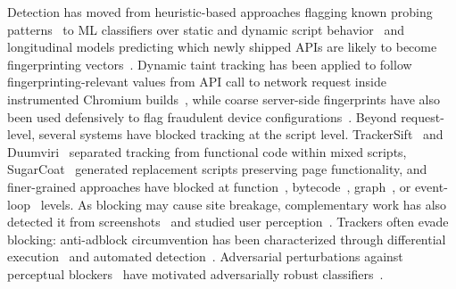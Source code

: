%
Detection has moved from heuristic-based approaches flagging known probing patterns~\cite{acarFPDetectiveDustingWeb2013} to ML classifiers over static and dynamic script behavior~\cite{iqbalFingerprintingFingerprintersLearning2021} and longitudinal models predicting which newly shipped APIs are likely to become fingerprinting vectors~\cite{bahramiFPRadarLongitudinalMeasurement2022}.
%
Dynamic taint tracking has been applied to follow fingerprinting-relevant values from API call to network request inside instrumented Chromium builds~\cite{boussahaFPtracerFinegrainedBrowser2024,kanyalPanoptiChromeModernInbrowser2024,hubletUserControlledPrivacyTaint2024}, while coarse server-side fingerprints have also been used defensively to flag fraudulent device configurations~\cite{kalantariBrowserPolygraphEfficient2024}.
% 
Beyond request-level, several systems have blocked tracking at the script level.
%
TrackerSift~\cite{amjadTrackerSiftUntanglingMixed2021} and Duumviri~\cite{shuangDuumviriDetectingTrackers2025} separated tracking from functional code within mixed scripts, SugarCoat~\cite{smithSugarCoatProgrammaticallyGenerating2021} generated replacement scripts preserving page functionality, and finer-grained approaches have blocked at function~\cite{amjadBlockingJavaScriptBreaking2023,amjadBlockingTrackingJavaScript2024}, bytecode~\cite{ghasemisharifReadLinesDetecting2023,bahramiByteByteUnmasking2025}, graph~\cite{parkCGCContrastiveGraph2022}, or event-loop~\cite{chenDetectingFilterList2021} levels.
%
As blocking may cause site breakage, complementary work has also detected it from screenshots~\cite{hajjchehadeSINBADSaliencyinformedDetection2024} and studied user perception~\cite{nisenoffDefiningBrokenUser2023}.
%
Trackers often evade blocking: anti-adblock circumvention has been characterized through differential execution~\cite{zhuMeasuringDisruptingAntiAdblockers2018} and automated detection~\cite{leCVInspectorAutomatingDetection2021}. 
%
Adversarial perturbations against perceptual blockers~\cite{tramerAdVersarialPerceptualAd2019} have motivated adversarially robust classifiers~\cite{limAdVersaAdversariallyRobustPractical2026}.


